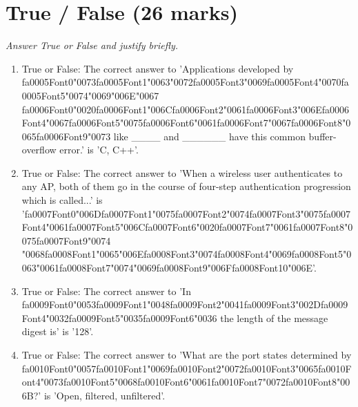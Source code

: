 \documentclass[12pt]{article}
\begin{document}
\section*{True / False (26 marks)}
\textit{Answer True or False and justify briefly.}
\begin{enumerate}[label=\arabic*.]
\item True or False: The correct answer to 'Applications developed by {\csname fa0005Font0\endcsname\char"0073}{\csname fa0005Font1\endcsname\char"0063}{\char"0072}{\csname fa0005Font3\endcsname\char"0069}{\csname fa0005Font4\endcsname\char"0070}{\csname fa0005Font5\endcsname\char"0074}{\char"0069}{\char"006E}{\char"0067} {\csname fa0006Font0\endcsname\char"0020}{\csname fa0006Font1\endcsname\char"006C}{\csname fa0006Font2\endcsname\char"0061}{\csname fa0006Font3\endcsname\char"006E}{\csname fa0006Font4\endcsname\char"0067}{\csname fa0006Font5\endcsname\char"0075}{\csname fa0006Font6\endcsname\char"0061}{\csname fa0006Font7\endcsname\char"0067}{\csname fa0006Font8\endcsname\char"0065}{\csname fa0006Font9\endcsname\char"0073} like \_\_\_\_ and \_\_\_\_\_\_ have this common buffer-overflow error.' is 'C, C++'.
\item True or False: The correct answer to 'When a wireless user authenticates to any AP, both of them go in the course of four-step authentication progression which is called...' is '{\csname fa0007Font0\endcsname\char"006D}{\csname fa0007Font1\endcsname\char"0075}{\csname fa0007Font2\endcsname\char"0074}{\csname fa0007Font3\endcsname\char"0075}{\csname fa0007Font4\endcsname\char"0061}{\csname fa0007Font5\endcsname\char"006C}{\csname fa0007Font6\endcsname\char"0020}{\csname fa0007Font7\endcsname\char"0061}{\csname fa0007Font8\endcsname\char"0075}{\csname fa0007Font9\endcsname\char"0074} {\char"0068}{\csname fa0008Font1\endcsname\char"0065}{\char"006E}{\csname fa0008Font3\endcsname\char"0074}{\csname fa0008Font4\endcsname\char"0069}{\csname fa0008Font5\endcsname\char"0063}{\char"0061}{\csname fa0008Font7\endcsname\char"0074}{\char"0069}{\csname fa0008Font9\endcsname\char"006F}{\csname fa0008Font10\endcsname\char"006E}'.
\item True or False: The correct answer to 'In {\csname fa0009Font0\endcsname\char"0053}{\csname fa0009Font1\endcsname\char"0048}{\csname fa0009Font2\endcsname\char"0041}{\csname fa0009Font3\endcsname\char"002D}{\csname fa0009Font4\endcsname\char"0032}{\csname fa0009Font5\endcsname\char"0035}{\csname fa0009Font6\endcsname\char"0036} the length of the message digest is' is '128'.
\item True or False: The correct answer to 'What are the port states determined by {\csname fa0010Font0\endcsname\char"0057}{\csname fa0010Font1\endcsname\char"0069}{\csname fa0010Font2\endcsname\char"0072}{\csname fa0010Font3\endcsname\char"0065}{\csname fa0010Font4\endcsname\char"0073}{\csname fa0010Font5\endcsname\char"0068}{\csname fa0010Font6\endcsname\char"0061}{\csname fa0010Font7\endcsname\char"0072}{\csname fa0010Font8\endcsname\char"006B}?' is 'Open, filtered, unfiltered'.

\end{enumerate}
\end{document}
